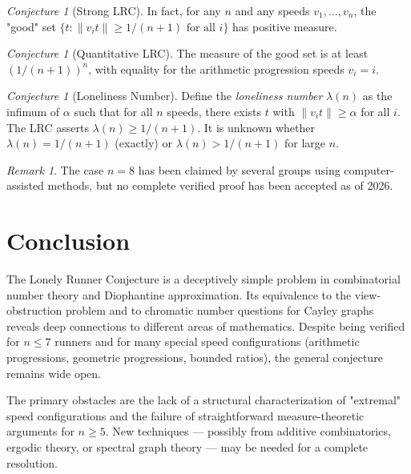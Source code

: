 \documentclass[12pt,a4paper]{amsart}
\theoremstyle{definition}
\theoremstyle{remark}
\newtheorem{remark}[theorem]{Remark}
\newtheorem{conjecture}[theorem]{Conjecture}
\begin{document}
\begin{conjecture}[Strong LRC]\label{conj:strong_lrc}
In fact, for any $n$ and any speeds $v_1, \ldots, v_n$, the "good" set
$\{t : \|v_i t\| \geq 1/(n+1) \text{ for all } i\}$ has positive measure.
\end{conjecture}

\begin{conjecture}[Quantitative LRC]\label{conj:quant_lrc}
The measure of the good set is at least $(1/(n+1))^n$, with equality for the
arithmetic progression speeds $v_i = i$.
\end{conjecture}

\begin{conjecture}[Loneliness Number]\label{conj:loneliness}
Define the \emph{loneliness number} $\lambda(n)$ as the infimum of $\alpha$ such
that for all $n$ speeds, there exists $t$ with $\|v_i t\| \geq \alpha$ for all $i$.
The LRC asserts $\lambda(n) \geq 1/(n+1)$.
It is unknown whether $\lambda(n) = 1/(n+1)$ (exactly) or $\lambda(n) > 1/(n+1)$
for large $n$.
\end{conjecture}

\begin{remark}
The case $n = 8$ has been claimed by several groups using computer-assisted methods,
but no complete verified proof has been accepted as of 2026.
\end{remark}

\section{Conclusion}

The Lonely Runner Conjecture is a deceptively simple problem in combinatorial
number theory and Diophantine approximation. Its equivalence to the view-obstruction
problem and to chromatic number questions for Cayley graphs reveals deep connections
to different areas of mathematics. Despite being verified for $n \leq 7$ runners
and for many special speed configurations (arithmetic progressions, geometric
progressions, bounded ratios), the general conjecture remains wide open.

The primary obstacles are the lack of a structural characterization of "extremal"
speed configurations and the failure of straightforward measure-theoretic arguments
for $n \geq 5$. New techniques — possibly from additive combinatorics, ergodic
theory, or spectral graph theory — may be needed for a complete resolution.
\end{document}
